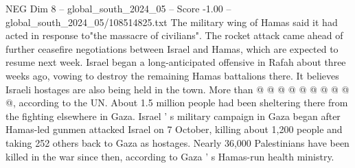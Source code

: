 \begin{textsample}{NEG Dim 8 – global\_south\_2024\_05 – Score -1.00 – global\_south\_2024\_05/108514825.txt}
The military wing of Hamas said it had acted in response to"the massacre of civilians".
The rocket attack came ahead of further ceasefire negotiations between Israel and Hamas, which are expected to resume next week.
Israel began a long-anticipated offensive in Rafah about three weeks ago, vowing to destroy the remaining Hamas battalions there.
It believes Israeli hostages are also being held in the town.
More than @ @ @ @ @ @ @ @ @ @, according to the UN.
About 1.5 million people had been sheltering there from the fighting elsewhere in Gaza.
Israel ' s military campaign in Gaza began after Hamas-led gunmen attacked Israel on 7 October, killing about 1,200 people and taking 252 others back to Gaza as hostages.
Nearly 36,000 Palestinians have been killed in the war since then, according to Gaza ' s Hamas-run health ministry.

\end{textsample}
